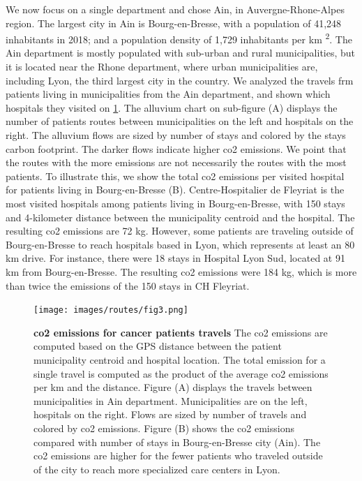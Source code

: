 We now focus on a single department and chose Ain, in Auvergne-Rhone-Alpes
region. The largest city in Ain is Bourg-en-Bresse, with a population of 41,248
inhabitants in 2018; and a population density of 1,729 inhabitants per km
\textsuperscript{2}. The Ain department is mostly populated with sub-urban and
rural municipalities, but it is located near the Rhone department, where urban
municipalities are, including Lyon, the third largest city in the country. We
analyzed the travels frm patients living in municipalities from the Ain
department, and shown which hospitals they visited on
\cref{fig:routes-co2-emissions}. The alluvium chart on sub-figure (A) displays
the number of patients routes between municipalities on the left and hospitals
on the right. The alluvium flows are sized by number of stays and colored by the
stays carbon footprint. The darker flows indicate higher \ac{co2} emissions. We
point that the routes with the more emissions are not necessarily the routes
with the most patients. To illustrate this, we show the total \ac{co2} emissions
per visited hospital for patients living in Bourg-en-Bresse (B).
Centre-Hospitalier de Fleyriat is the most visited hospitals among patients
living in Bourg-en-Bresse, with 150 stays and 4-kilometer distance between the
municipality centroid and the hospital. The resulting \ac{co2} emissions are 72
kg. However, some patients are traveling outside of Bourg-en-Bresse to reach
hospitals based in Lyon, which represents at least an 80 km drive. For instance,
there were 18 stays in Hospital Lyon Sud, located at 91 km from Bourg-en-Bresse.
The resulting \ac{co2} emissions were 184 kg, which is more than twice the
emissions of the 150 stays in CH Fleyriat.

\begin{figure}[h!]
    \texttt{[image: images/routes/fig3.png]}
    \centering
    \caption{ \textbf{\ac{co2} emissions for cancer patients travels} The
        \ac{co2} emissions are computed based on the GPS distance between the
        patient municipality centroid and hospital location. The total emission
        for a single travel is computed as the product of the average \ac{co2}
        emissions per km and the distance. Figure (A) displays the travels
        between municipalities in Ain department. Municipalities are on the
        left, hospitals on the right. Flows are sized by number of travels and
        colored by \ac{co2} emissions. Figure (B) shows the \ac{co2} emissions
        compared with number of stays in Bourg-en-Bresse city (Ain). The
        \ac{co2} emissions are higher for the fewer patients who traveled
        outside of the city to reach more specialized care centers in Lyon. }
    \label{fig:routes-co2-emissions}
\end{figure}

